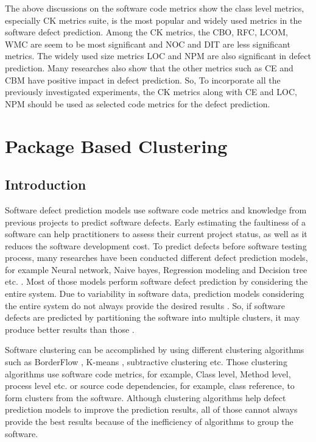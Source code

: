 \documentclass[12pt]{report}
\begin{document}
The above discussions on the software code metrics show the class level metrics, especially CK metrics suite, is the most popular and widely used metrics in the software defect prediction. Among the CK metrics, the CBO, RFC, LCOM, WMC are seem to be most significant and NOC and DIT are less significant metrics. The widely used size metrics LOC and NPM are also significant in defect prediction. Many researches also show that the other metrics such as CE and CBM have positive impact in defect prediction. So, To incorporate all the previously investigated experiments, the CK metrics along with CE and LOC, NPM should be used as selected code metrics for the defect prediction.     

\chapter{Package Based Clustering}

\section{Introduction}

Software defect prediction models use software code metrics and knowledge from previous projects to predict software defects. Early estimating the faultiness of a software can help practitioners to assess their current project status, as well as it reduces the software development cost. To predict defects before software testing process, many researches have been conducted different defect prediction models, for example Neural network, Naive bayes, Regression modeling and Decision tree etc. \cite{catal2009systematic}. Most of those models perform software defect prediction by considering the entire system. Due to variability in software data, prediction models considering the entire system do not always provide the desired results \cite{bettenburg2012think}. So, if software defects are predicted by partitioning the software into multiple clusters, it may produce better results than those \cite{scanniello2013class}.

Software clustering can be accomplished by using different clustering algorithms such as BorderFlow \cite{}, K-means \cite{}, subtractive \cite{} clustering etc. Those clustering algorithms use software code metrics, for example, Class level, Method level, process level etc. or source code dependencies, for example, class reference, to form clusters from the software. Although clustering algorithms help defect prediction models to improve the prediction results, all of those cannot always provide the best results because of the inefficiency of algorithms to group the software.
\end{document}
